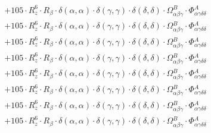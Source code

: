 \documentclass{article}
\begin{document}
\begin{subequations}
\begin{gather}
\begin{array}{c}
 \\[0.2em] 		 + 105 \cdot R_{z}^{6} \cdot R_{\beta{}} \cdot \delta{}\left(\alpha{}, \alpha{}\right) \cdot \delta{}\left(\gamma{}, \gamma{}\right) \cdot \delta{}\left(\delta{}, \delta{}\right) \cdot \Omega{}^{B}_{\alpha{}\beta{}\gamma{}} \cdot \Phi{}^{A}_{\alpha{}\gamma{}\delta{}\delta{}} 
 \\[0.2em] 		 + 105 \cdot R_{z}^{6} \cdot R_{\beta{}} \cdot \delta{}\left(\alpha{}, \alpha{}\right) \cdot \delta{}\left(\gamma{}, \gamma{}\right) \cdot \delta{}\left(\delta{}, \delta{}\right) \cdot \Omega{}^{B}_{\alpha{}\beta{}\gamma{}} \cdot \Phi{}^{A}_{\alpha{}\gamma{}\delta{}\delta{}} 
 \\[0.2em] 		 + 105 \cdot R_{z}^{6} \cdot R_{\beta{}} \cdot \delta{}\left(\alpha{}, \alpha{}\right) \cdot \delta{}\left(\gamma{}, \gamma{}\right) \cdot \delta{}\left(\delta{}, \delta{}\right) \cdot \Omega{}^{B}_{\alpha{}\beta{}\gamma{}} \cdot \Phi{}^{A}_{\alpha{}\gamma{}\delta{}\delta{}} 
 \\[0.2em] 		 + 105 \cdot R_{z}^{6} \cdot R_{\beta{}} \cdot \delta{}\left(\alpha{}, \alpha{}\right) \cdot \delta{}\left(\gamma{}, \gamma{}\right) \cdot \delta{}\left(\delta{}, \delta{}\right) \cdot \Omega{}^{B}_{\alpha{}\beta{}\gamma{}} \cdot \Phi{}^{A}_{\alpha{}\gamma{}\delta{}\delta{}} 
 \\[0.2em] 		 + 105 \cdot R_{z}^{6} \cdot R_{\beta{}} \cdot \delta{}\left(\alpha{}, \alpha{}\right) \cdot \delta{}\left(\gamma{}, \gamma{}\right) \cdot \delta{}\left(\delta{}, \delta{}\right) \cdot \Omega{}^{B}_{\alpha{}\beta{}\gamma{}} \cdot \Phi{}^{A}_{\alpha{}\gamma{}\delta{}\delta{}} 
 \\[0.2em] 		 + 105 \cdot R_{z}^{6} \cdot R_{\beta{}} \cdot \delta{}\left(\alpha{}, \alpha{}\right) \cdot \delta{}\left(\gamma{}, \gamma{}\right) \cdot \delta{}\left(\delta{}, \delta{}\right) \cdot \Omega{}^{B}_{\alpha{}\beta{}\gamma{}} \cdot \Phi{}^{A}_{\alpha{}\gamma{}\delta{}\delta{}} 
 \\[0.2em] 		 + 105 \cdot R_{z}^{6} \cdot R_{\beta{}} \cdot \delta{}\left(\alpha{}, \alpha{}\right) \cdot \delta{}\left(\gamma{}, \gamma{}\right) \cdot \delta{}\left(\delta{}, \delta{}\right) \cdot \Omega{}^{B}_{\alpha{}\beta{}\gamma{}} \cdot \Phi{}^{A}_{\alpha{}\gamma{}\delta{}\delta{}} 
 \\[0.2em] 		 + 105 \cdot R_{z}^{6} \cdot R_{\beta{}} \cdot \delta{}\left(\alpha{}, \alpha{}\right) \cdot \delta{}\left(\gamma{}, \gamma{}\right) \cdot \delta{}\left(\delta{}, \delta{}\right) \cdot \Omega{}^{B}_{\alpha{}\beta{}\gamma{}} \cdot \Phi{}^{A}_{\alpha{}\gamma{}\delta{}\delta{}} 

\end{array}
\end{gather}
\end{subequations}
\end{document}
